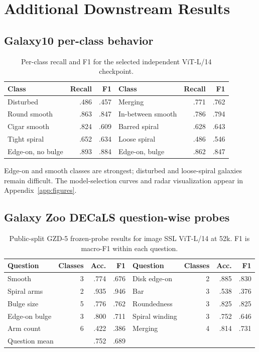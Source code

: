 \documentclass{article}
\begin{document}
\FloatBarrier
\section{Additional Downstream Results}
\label{app:downstream}

\subsection{Galaxy10 per-class behavior}

\begin{table}[h]
\centering
\caption{Per-class recall and F1 for the selected independent ViT-L/14
checkpoint.}
\label{tab:galaxy10_classes}
\small
\begin{tabular}{lrr@{\qquad}lrr}
\toprule
Class & Recall & F1 & Class & Recall & F1\\
\midrule
Disturbed & .486 & .457 & Merging & .771 & .762\\
Round smooth & .863 & .847 & In-between smooth & .786 & .794\\
Cigar smooth & .824 & .609 & Barred spiral & .628 & .643\\
Tight spiral & .652 & .634 & Loose spiral & .486 & .546\\
Edge-on, no bulge & .893 & .884 & Edge-on, bulge & .862 & .847\\
\bottomrule
\end{tabular}
\end{table}

Edge-on and smooth classes are strongest; disturbed and loose-spiral galaxies
remain difficult.
The model-selection curves and radar visualization appear in
Appendix~\ref{app:figures}.

\subsection{Galaxy Zoo DECaLS question-wise probes}

\begin{table}[h]
\centering
\caption{Public-split GZD-5 frozen-probe results for image SSL ViT-L/14 at 52k.
F1 is macro-F1 within each question.}
\label{tab:gzd5}
\small
\setlength{\tabcolsep}{4pt}
\begin{tabular}{lrrr@{\quad}lrrr}
\toprule
Question & Classes & Acc. & F1 & Question & Classes & Acc. & F1\\
\midrule
Smooth & 3 & .774 & .676 & Disk edge-on & 2 & .885 & .830\\
Spiral arms & 2 & .935 & .946 & Bar & 3 & .538 & .376\\
Bulge size & 5 & .776 & .762 & Roundedness & 3 & .825 & .825\\
Edge-on bulge & 3 & .800 & .711 & Spiral winding & 3 & .752 & .646\\
Arm count & 6 & .422 & .386 & Merging & 4 & .814 & .731\\
\midrule
\multicolumn{2}{l}{Question mean} & .752 & .689 &&&&\\
\bottomrule
\end{tabular}
\end{table}
\end{document}
